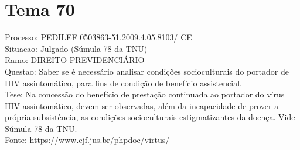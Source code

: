 \documentclass[12pt]{article}
\begin{document}
\section*{Tema 70}
Processo: PEDILEF 0503863-51.2009.4.05.8103/ CE\\
Situacao: Julgado (Súmula 78 da TNU)\\
Ramo: DIREITO PREVIDENCIÁRIO\\
Questao: Saber se é necessário analisar condições socioculturais do portador de HIV assintomático, para fins de condição de benefício assistencial.\\
Tese: Na concessão do benefício de prestação continuada ao portador do vírus HIV assintomático, devem ser observadas, além da incapacidade de prover a própria subsistência, as condições socioculturais estigmatizantes da doença. Vide Súmula 78 da TNU.\\
Fonte: https://www.cjf.jus.br/phpdoc/virtus/
\end{document}
